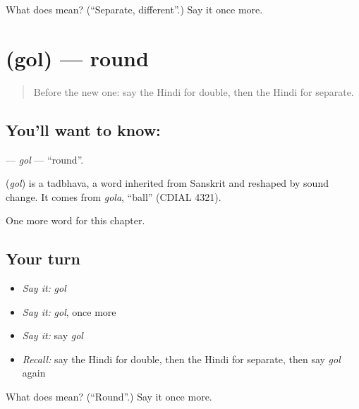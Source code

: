 \begin{tcolorbox}[breakable,colback=teal!4,colframe=teal!35!black,title={Before you move on}]
What does  mean? (\textquotedblleft{}Separate, different\textquotedblright{}.) Say it once more.
\end{tcolorbox}
\section[\texorpdfstring{\hi{गोल} (gol)}{गोल (gol)}]{ (gol) — round}

\label{lesson:HI-C236-gol}



\begin{quote}
Before the new one: say the Hindi for double, then the Hindi for separate.
\end{quote}

\subsection*{You'll want to know: }
\textbf{} — \emph{gol} — \textquotedblleft{}round\textquotedblright{}.

\begin{cousinweb}
\textbf{} (\emph{gol}) is a tadbhava, a word inherited from Sanskrit and reshaped by sound change. It comes from \emph{gola}, \textquotedblleft{}ball\textquotedblright{} (CDIAL 4321).
\end{cousinweb}

\begin{grammarlens}[title={What you've built}]
One more word for this chapter.
\end{grammarlens}

\subsection*{Your turn}
\begin{itemize}
\raggedright
  \item \emph{Say it:} \emph{gol}
  \item \emph{Say it:} \emph{gol}, once more
  \item \emph{Say it:} say \emph{gol}
  \item \emph{Recall:} say the Hindi for double, then the Hindi for separate, then say \emph{gol} again
\end{itemize}

\begin{tcolorbox}[breakable,colback=teal!4,colframe=teal!35!black,title={Before you move on}]
What does  mean? (\textquotedblleft{}Round\textquotedblright{}.) Say it once more.
\end{tcolorbox}
